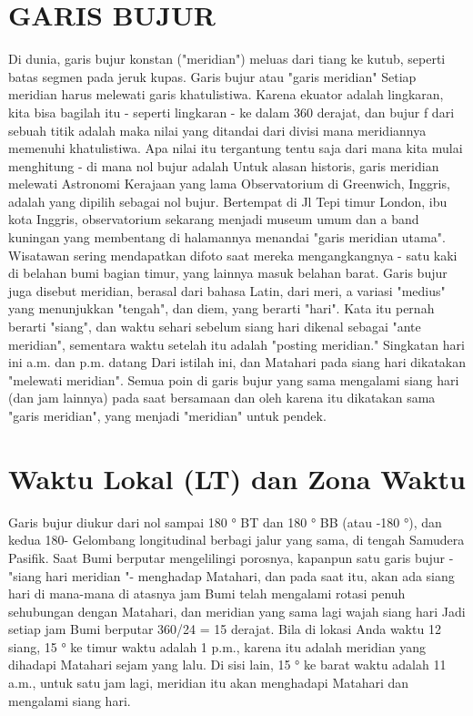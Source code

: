 \section{GARIS BUJUR}
	Di dunia, garis bujur konstan ("meridian") meluas dari tiang ke kutub, seperti
	batas segmen pada jeruk kupas.
	Garis bujur atau "garis meridian"
	Setiap meridian harus melewati garis khatulistiwa. Karena ekuator adalah lingkaran, kita bisa
	bagilah itu - seperti lingkaran - ke dalam 360 derajat, dan bujur f dari sebuah titik adalah
	maka nilai yang ditandai dari divisi mana meridiannya memenuhi khatulistiwa.
	Apa nilai itu tergantung tentu saja dari mana kita mulai menghitung - di mana
	nol bujur adalah Untuk alasan historis, garis meridian melewati Astronomi Kerajaan yang lama
	Observatorium di Greenwich, Inggris, adalah yang dipilih sebagai nol bujur. Bertempat di Jl
	Tepi timur London, ibu kota Inggris, observatorium sekarang menjadi museum umum dan a
	band kuningan yang membentang di halamannya menandai "garis meridian utama". Wisatawan sering mendapatkan
	difoto saat mereka mengangkangnya - satu kaki di belahan bumi bagian timur, yang lainnya masuk belahan barat.
	Garis bujur juga disebut meridian, berasal dari bahasa Latin, dari meri, a
	variasi "medius" yang menunjukkan "tengah", dan diem, yang berarti "hari". Kata itu
	pernah berarti "siang", dan waktu sehari sebelum siang hari dikenal sebagai "ante meridian",
	sementara waktu setelah itu adalah "posting meridian." Singkatan hari ini a.m. dan p.m. datang
	Dari istilah ini, dan Matahari pada siang hari dikatakan "melewati meridian". Semua poin di
	garis bujur yang sama mengalami siang hari (dan jam lainnya) pada saat bersamaan dan
	oleh karena itu dikatakan sama "garis meridian", yang menjadi "meridian" untuk
	pendek.

\section{Waktu Lokal (LT) dan Zona Waktu}
	Garis bujur diukur dari nol sampai 180 ° BT dan 180 ° BB (atau -180 °), dan kedua 180-
	Gelombang longitudinal berbagi jalur yang sama, di tengah Samudera Pasifik.
	Saat Bumi berputar mengelilingi porosnya, kapanpun satu garis bujur - "siang hari
	meridian "- menghadap Matahari, dan pada saat itu, akan ada siang hari di mana-mana di atasnya
	jam Bumi telah mengalami rotasi penuh sehubungan dengan Matahari, dan meridian yang sama
	lagi wajah siang hari Jadi setiap jam Bumi berputar 360/24 = 15 derajat.
	Bila di lokasi Anda waktu 12 siang, 15 ° ke timur waktu adalah 1 p.m., karena itu adalah
	meridian yang dihadapi Matahari sejam yang lalu. Di sisi lain, 15 ° ke barat waktu adalah 11
	a.m., untuk satu jam lagi, meridian itu akan menghadapi Matahari dan mengalami siang hari.

